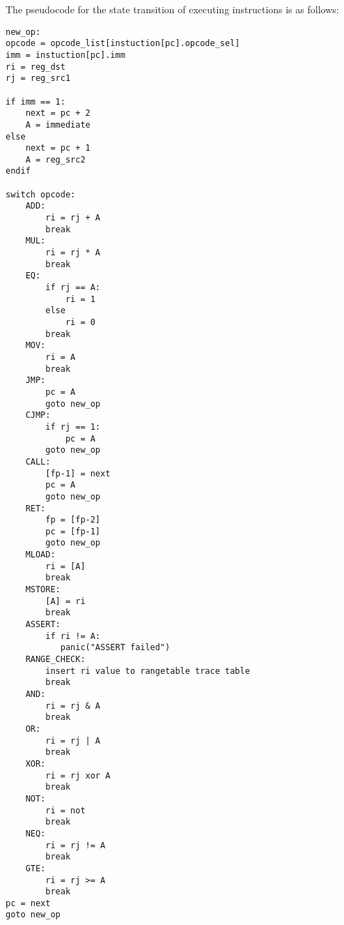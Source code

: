\begin{table}[!ht]
    \centering {}
    \caption{OlaVM instruction encode format}
    \label{table: processor_instruction_decode}
\end{table}

The pseudocode for the state transition of executing instructions is as follows:
\begin{lstlisting}[language={}]
new_op:
opcode = opcode_list[instuction[pc].opcode_sel]
imm = instuction[pc].imm
ri = reg_dst
rj = reg_src1

if imm == 1:
    next = pc + 2
    A = immediate
else
    next = pc + 1
    A = reg_src2
endif

switch opcode:
    ADD:
        ri = rj + A
        break
    MUL:
        ri = rj * A
        break
    EQ:
        if rj == A:
            ri = 1
        else
            ri = 0
        break
    MOV:
        ri = A
        break
    JMP:
        pc = A
        goto new_op
    CJMP:
        if rj == 1:
            pc = A
        goto new_op
    CALL:
        [fp-1] = next
        pc = A
        goto new_op
    RET:
        fp = [fp-2]
        pc = [fp-1]
        goto new_op
    MLOAD:
        ri = [A]
        break
    MSTORE:
        [A] = ri
        break
    ASSERT:
        if ri != A:
           panic("ASSERT failed")
    RANGE_CHECK:
        insert ri value to rangetable trace table
        break
    AND:
        ri = rj & A
        break
    OR:
        ri = rj | A
        break
    XOR:
        ri = rj xor A
        break
    NOT:
        ri = not
        break
    NEQ:
        ri = rj != A
        break
    GTE:
        ri = rj >= A
        break
pc = next
goto new_op
\end{lstlisting}


